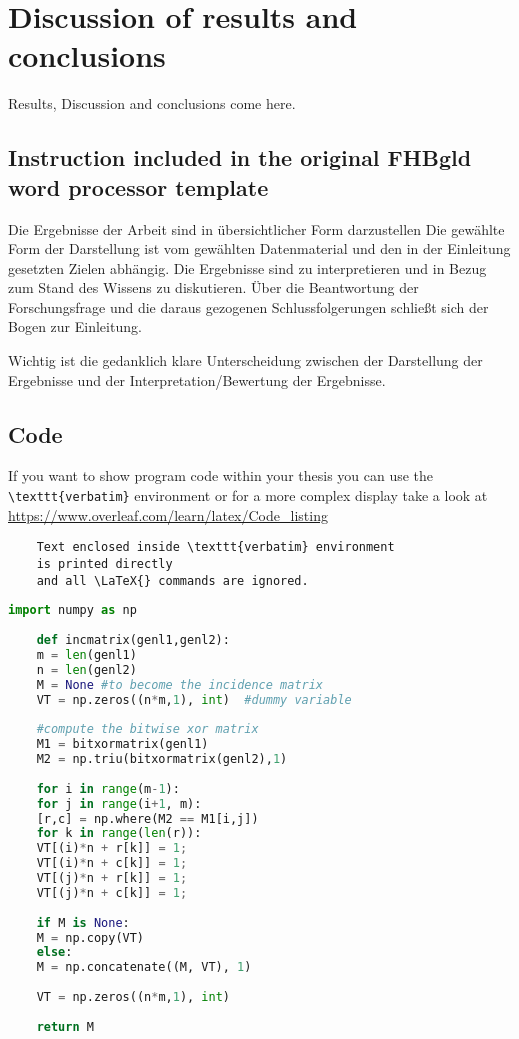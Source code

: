 \chapter{Discussion of results and conclusions}

Results, Discussion and conclusions come here.

\section{Instruction included in the original FHBgld word processor template}
Die Ergebnisse der Arbeit sind in übersichtlicher Form darzustellen Die gewählte Form der Darstellung ist vom gewählten Datenmaterial und den in der Einleitung gesetzten Zielen abhängig. Die Ergebnisse sind zu interpretieren und in Bezug zum Stand des Wissens zu diskutieren. Über die Beantwortung der Forschungsfrage und die daraus gezogenen Schlussfolgerungen schließt sich der Bogen zur Einleitung. 

Wichtig ist die gedanklich klare Unterscheidung zwischen der Darstellung der Ergebnisse und der Interpretation/Bewertung der Ergebnisse. 

\section{Code}
If you want to show program code within your thesis you can use the \verb|\texttt{verbatim}| environment or for a more complex display take a look at \url{https://www.overleaf.com/learn/latex/Code_listing}

\begin{verbatim}
	Text enclosed inside \texttt{verbatim} environment 
	is printed directly 
	and all \LaTeX{} commands are ignored.
\end{verbatim}

\begin{lstlisting}[language=Python, caption=Python example]
	import numpy as np
	
	def incmatrix(genl1,genl2):
	m = len(genl1)
	n = len(genl2)
	M = None #to become the incidence matrix
	VT = np.zeros((n*m,1), int)  #dummy variable
	
	#compute the bitwise xor matrix
	M1 = bitxormatrix(genl1)
	M2 = np.triu(bitxormatrix(genl2),1) 
	
	for i in range(m-1):
	for j in range(i+1, m):
	[r,c] = np.where(M2 == M1[i,j])
	for k in range(len(r)):
	VT[(i)*n + r[k]] = 1;
	VT[(i)*n + c[k]] = 1;
	VT[(j)*n + r[k]] = 1;
	VT[(j)*n + c[k]] = 1;
	
	if M is None:
	M = np.copy(VT)
	else:
	M = np.concatenate((M, VT), 1)
	
	VT = np.zeros((n*m,1), int)
	
	return M
\end{lstlisting}
